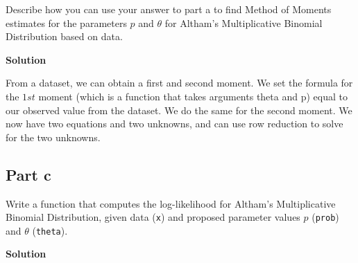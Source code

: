 \documentclass[
]{article}
\begin{document}
Describe how you can use your answer to part a to find Method of Moments
estimates for the parameters \(p\) and \(\theta\) for Altham's
Multiplicative Binomial Distribution based on data.

\textbf{Solution}

From a dataset, we can obtain a first and second moment. We set the
formula for the \(1st\) moment (which is a function that takes arguments
theta and p) equal to our observed value from the dataset. We do the
same for the second moment. We now have two equations and two unknowns,
and can use row reduction to solve for the two unknowns.

\subsection{Part c}\label{part-c-1}

Write a function that computes the log-likelihood for Altham's
Multiplicative Binomial Distribution, given data (\texttt{x}) and
proposed parameter values \(p\) (\texttt{prob}) and \(\theta\)
(\texttt{theta}).

\textbf{Solution}

\normalsize
\end{document}
